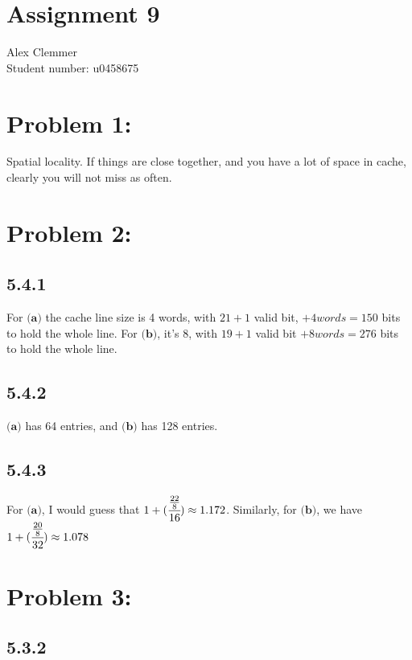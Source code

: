 \documentclass[a4paper]{article}
\begin{document}
\section*{Assignment 9}
Alex Clemmer\\
Student number: u0458675

\section*{Problem 1:}

Spatial locality. If things are close together, and you have a lot of space in cache, clearly you will not miss as often.

\section*{Problem 2:}

\subsection*{5.4.1}

For $\textbf{(a)}$ the cache line size is 4 words, with $21 + 1$ valid bit, $+ 4 words = 150$ bits to hold the whole line. For  $\textbf{(b)}$, it's 8, with $19 + 1$ valid bit $+8 words = 276$ bits to hold the whole line.

\subsection*{5.4.2}

$\textbf{(a)}$ has 64 entries, and $\textbf{(b)}$ has 128 entries.

\subsection*{5.4.3}

For $\textbf{(a)}$, I would guess that $1 + (\cfrac{\frac{22}{8}}{16}) \approx 1.172$. Similarly, for $\textbf{(b)}$, we have $1 + (\cfrac{\frac{20}{8}}{32}) \approx 1.078$

\section*{Problem 3:}

\subsection*{5.3.2}
\end{document}
